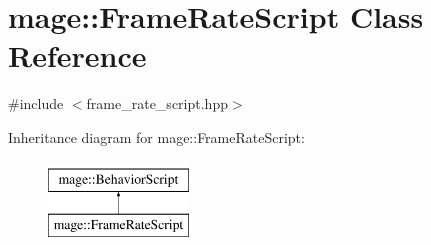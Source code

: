 \hypertarget{classmage_1_1_frame_rate_script}{}\section{mage\+:\+:Frame\+Rate\+Script Class Reference}
\label{classmage_1_1_frame_rate_script}


{\ttfamily \#include $<$frame\+\_\+rate\+\_\+script.\+hpp$>$}

Inheritance diagram for mage\+:\+:Frame\+Rate\+Script\+:\begin{figure}[H]
\begin{center}
\leavevmode
\includegraphics[height=2.000000cm]{classmage_1_1_frame_rate_script}
\end{center}
\end{figure}
